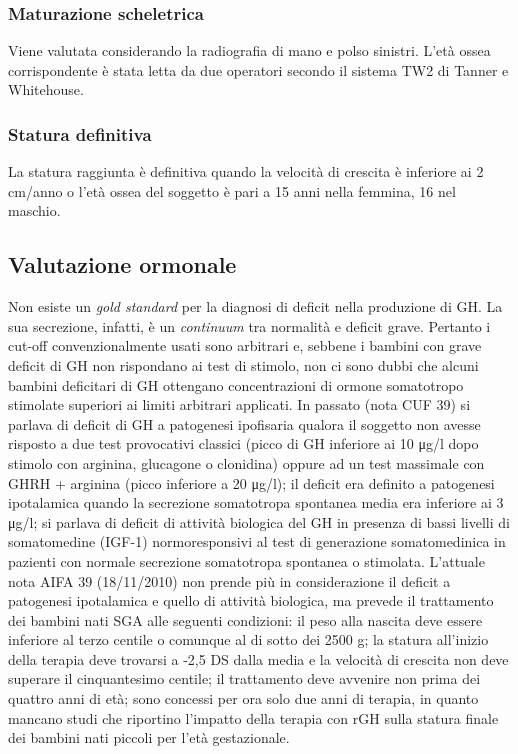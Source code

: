 \subsubsection*{Maturazione scheletrica}
Viene valutata considerando la radiografia di mano e polso sinistri. L'età ossea corrispondente è stata letta da due operatori secondo il sistema TW2 di Tanner e Whitehouse\cite{tanner1983assessment}.


\subsubsection*{Statura definitiva}
La statura raggiunta è definitiva quando la velocità di crescita è inferiore ai 2 cm/anno o l'età ossea del soggetto è pari a 15 anni nella femmina, 16 nel maschio.


\clearpage

\subsection{Valutazione ormonale}

Non esiste un \emph{gold standard} per la diagnosi di deficit nella produzione di GH\cite{gh2003update}. La sua secrezione, infatti, è un \emph{continuum} tra normalità e deficit grave. Pertanto i cut-off convenzionalmente usati sono arbitrari e, sebbene i bambini con grave deficit di GH non rispondano ai test di stimolo, non ci sono dubbi che alcuni bambini deficitari di GH ottengano concentrazioni di ormone somatotropo stimolate superiori ai limiti arbitrari applicati.
In passato (nota CUF 39) si parlava di deficit di GH a patogenesi ipofisaria qualora il soggetto non avesse risposto a due test provocativi classici (picco di GH inferiore ai 10 \unit{\micro g}/l dopo stimolo con arginina, glucagone o clonidina) oppure ad un test massimale con GHRH + arginina (picco inferiore a 20 \unit{\micro g}/l); il deficit era definito a patogenesi ipotalamica quando la secrezione somatotropa spontanea media era inferiore ai 3 \unit{\micro g}/l; si parlava di deficit di attività biologica del GH in presenza di bassi livelli di somatomedine (IGF-1) normoresponsivi al test di generazione somatomedinica in pazienti con normale secrezione somatotropa spontanea o stimolata.
L'attuale nota AIFA 39 (18/11/2010) non prende più in considerazione il deficit a patogenesi ipotalamica e quello di attività biologica, ma prevede il trattamento dei bambini nati SGA alle seguenti condizioni: il peso alla nascita deve essere inferiore al terzo centile o comunque al di sotto dei 2500 g; la statura all'inizio della terapia deve trovarsi a -2,5 DS dalla media e la velocità di crescita non deve superare il cinquantesimo centile; il trattamento deve avvenire non prima dei quattro anni di età; sono concessi per ora solo due anni di terapia, in quanto mancano studi che riportino l'impatto della terapia con rGH sulla statura finale dei bambini nati piccoli per l'età gestazionale.

